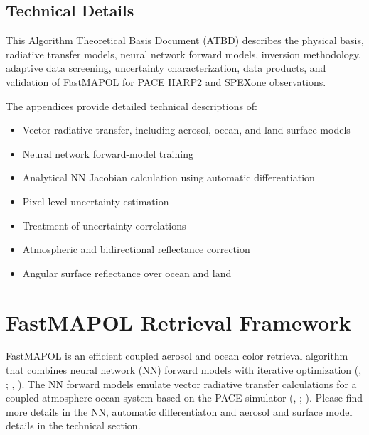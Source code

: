 \documentclass[
  11pt,
  letterpaper,
]{scrreprt}
\providecommand{\tightlist}{%
  \setlength{\itemsep}{0pt}\setlength{\parskip}{0pt}}
\begin{document}
\section{Technical Details}\label{technical-details}

This Algorithm Theoretical Basis Document (ATBD) describes the physical
basis, radiative transfer models, neural network forward models,
inversion methodology, adaptive data screening, uncertainty
characterization, data products, and validation of FastMAPOL for PACE
HARP2 and SPEXone observations.

The appendices provide detailed technical descriptions of:

\begin{itemize}
\tightlist
\item
  Vector radiative transfer, including aerosol, ocean, and land surface
  models
\item
  Neural network forward-model training
\item
  Analytical NN Jacobian calculation using automatic differentiation
\item
  Pixel-level uncertainty estimation
\item
  Treatment of uncertainty correlations
\item
  Atmospheric and bidirectional reflectance correction
\item
  Angular surface reflectance over ocean and land
\end{itemize}


\chapter{FastMAPOL Retrieval Framework}\label{sec-retrieval}

FastMAPOL is an efficient coupled aerosol and ocean color retrieval
algorithm that combines neural network (NN) forward models with
iterative optimization (,
; , ). The NN forward models emulate
vector radiative transfer calculations for a coupled atmosphere-ocean
system based on the PACE simulator (, ;
). Please find more details
in the NN, automatic differentiaton and aerosol and surface model
details in the technical section.
\end{document}
